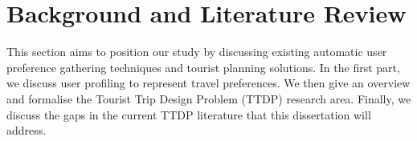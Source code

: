 
\section{Background and Literature Review}
\label{Literature}

This section aims to position our study by discussing
existing automatic user preference gathering
techniques and tourist planning solutions. In the
first part, we discuss user profiling to represent
travel preferences. We then give an overview and
formalise the 
Tourist Trip Design Problem (TTDP)
research area.  Finally, we discuss
the gaps in the current TTDP literature that this
dissertation will address.


